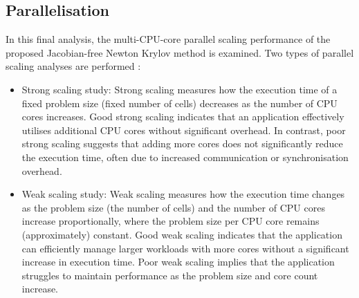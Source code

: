 \documentclass[sn-mathphys,Numbered]{sn-jnl}%
\begin{document}
\subsection{Parallelisation}
\label{sec:parallelisation}
In this final analysis, the multi-CPU-core parallel scaling performance of the proposed Jacobian-free Newton Krylov method is examined.
Two types of parallel scaling analyses are performed \cite{Knoll2004}:
\begin{itemize}
	\item Strong scaling study: Strong scaling measures how the execution time of a fixed problem size (fixed number of cells) decreases as the number of CPU cores increases.
	Good strong scaling indicates that an application effectively utilises additional CPU cores without significant overhead.
	In contrast, poor strong scaling suggests that adding more cores does not significantly reduce the execution time, often due to increased communication or synchronisation overhead.

	\item Weak scaling study: Weak scaling measures how the execution time changes as the problem size (the number of cells) and the number of CPU cores increase proportionally, where the problem size per CPU core remains (approximately) constant.
	Good weak scaling indicates that the application can efficiently manage larger workloads with more cores without a significant increase in execution time.
	Poor weak scaling implies that the application struggles to maintain performance as the problem size and core count increase.
\end{itemize}
\end{document}
